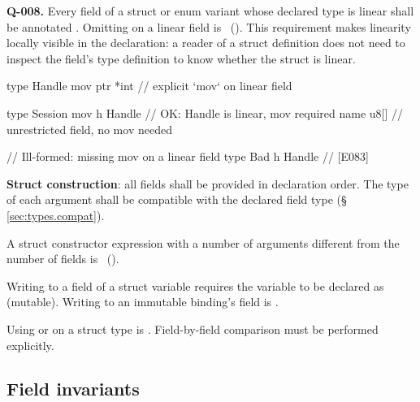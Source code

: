 \begin{constraint}
  \textbf{Q-008.}
  Every field of a struct or enum variant whose declared type is linear
  shall be annotated .  Omitting  on a linear field
  is \illformed{}~().  This requirement makes linearity
  locally visible in the declaration: a reader of a struct definition
  does not need to inspect the field's type definition to know whether
  the struct is linear.
\end{constraint}

\begin{example}
\begin{laincode}
type Handle {
    mov ptr *int            // explicit `mov` on linear field
}

type Session {
    mov h Handle            // OK: Handle is linear, mov required
    name u8[]               // unrestricted field, no mov needed
}

// Ill-formed: missing mov on a linear field
type Bad {
    h Handle                // [E083]
}
\end{laincode}
\end{example}

\pnum
\textbf{Struct construction}: all fields shall be provided in declaration
order.  The type of each argument shall be compatible with the declared
field type (\S\,\ref{sec:types.compat}).

\begin{constraint}
  A struct constructor expression with a number of arguments different from
  the number of fields is \illformed{}~().
\end{constraint}

\begin{constraint}
  Writing to a field of a struct variable requires the variable to be
  declared as  (mutable).  Writing to an immutable binding's
  field is \illformed{}.
\end{constraint}

\begin{constraint}
  Using \lain{==} or \lain{!=} on a struct type is \illformed{}.
  Field-by-field comparison must be performed explicitly.
\end{constraint}

\subsection{Field invariants}
\label{sec:types.struct.invariants}

